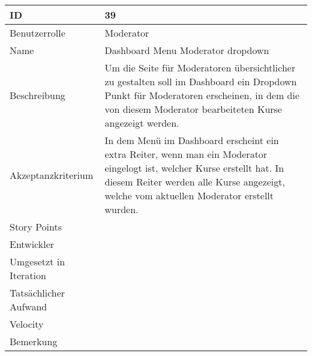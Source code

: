 \begin{tabularx}{\textwidth}{|p{}|X|}
	\hline
	ID & 39 \\
	\hline
	Benutzerrolle & Moderator \\
	\hline
	Name & Dashboard Menu Moderator dropdown\\
	\hline
	Beschreibung & Um die Seite für Moderatoren übersichtlicher zu gestalten soll im Dashboard ein Dropdown Punkt für Moderatoren erscheinen, in dem die von diesem Moderator bearbeiteten Kurse angezeigt werden.  \\
	\hline
	Akzeptanzkriterium & In dem Menü im Dashboard erscheint ein extra Reiter, wenn man ein Moderator eingelogt ist, welcher Kurse erstellt hat. In diesem Reiter werden alle Kurse angezeigt, welche vom aktuellen Moderator erstellt wurden. \\
	\hline
	Story Points & \\
	\hline
	Entwickler & \\
	\hline
	Umgesetzt in Iteration & \\
	\hline
	Tatsächlicher Aufwand & \\
	\hline
	Velocity & \\
	\hline
	Bemerkung & \\
	\hline
\end{tabularx}
\vspace{20pt}

